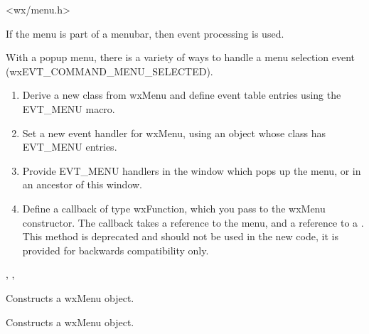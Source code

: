 
<wx/menu.h>


If the menu is part of a menubar, then  event processing is used.

With a popup menu, there is a variety of ways to handle a menu selection event
(wxEVT\_COMMAND\_MENU\_SELECTED).

\begin{enumerate}\itemsep=0pt
\item Derive a new class from wxMenu and define event table entries using the EVT\_MENU macro.
\item Set a new event handler for wxMenu, using an object whose class has EVT\_MENU entries.
\item Provide EVT\_MENU handlers in the window which pops up the menu, or in an ancestor of
this window.
\item Define a callback of type wxFunction, which you pass to the wxMenu constructor.
The callback takes a reference to the menu, and a reference to a
. This method is deprecated and should
not be used in the new code, it is provided for backwards compatibility only.
\end{enumerate}


, ,\rtfsp
{}


\label{wxmenuconstr}


Constructs a wxMenu object.





Constructs a wxMenu object.



